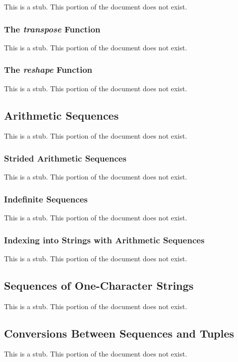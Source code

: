This is a stub.  This portion of the document does not exist.

\subsubsection{The {\em transpose} Function}
\label{The_em_transpose_Function}

This is a stub.  This portion of the document does not exist.

\subsubsection{The {\em reshape} Function}
\label{The_em_reshape_Function}

This is a stub.  This portion of the document does not exist.

\subsection{Arithmetic Sequences}
\label{Arithmetic_Sequences}

This is a stub.  This portion of the document does not exist.

\subsubsection{Strided Arithmetic Sequences}
\label{Strided_Arithmetic_Sequences}

This is a stub.  This portion of the document does not exist.

\subsubsection{Indefinite Sequences}
\label{Indefinite_Sequences}

This is a stub.  This portion of the document does not exist.

\subsubsection{Indexing into Strings with Arithmetic Sequences}
\label{Indexing_into_Strings_with_Arithmetic_Sequences}

This is a stub.  This portion of the document does not exist.

\subsection{Sequences of One-Character Strings}
\label{Sequences_of_One-Character_Strings}

This is a stub.  This portion of the document does not exist.

\subsection{Conversions Between Sequences and Tuples}
\label{Conversions_Between_Sequences_and_Tuples}

This is a stub.  This portion of the document does not exist.
